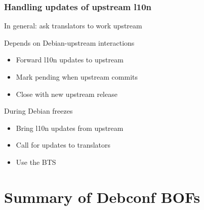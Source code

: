 \documentclass{beamer}
\begin{document}
\begin{frame}
  \frametitle{Handling updates of upstream l10n}
	\begin{block}
		{In general: ask translators to work upstream}
	\end{block}
	\begin{block}
		{Depends on Debian-upstream interactions}
		\begin{itemize}
		\item
			Forward l10n updates to upstream
		\item
			Mark pending when upstream commits
		\item
			Close with new upstream release
		\end{itemize}
	\end{block}
	\begin{block}
		{During Debian freezes}
		\begin{itemize}
		\item
			Bring l10n updates from upstream
		\item
			Call for updates to translators
		\item
			Use the BTS
		\end{itemize}
	\end{block}
\end{frame}


\section{Summary of Debconf BOFs}
\end{document}
